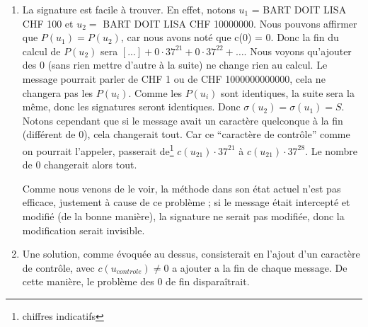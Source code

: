 \documentclass[10p,a4paper]{scrartcl}
\begin{document}
\begin{enumerate}
	\item	La signature est facile à trouver. En effet, notons $u_1$ = BART DOIT LISA CHF 100 et $u_2 =$ BART DOIT LISA CHF 10000000. Nous pouvons affirmer que $P(u_1) = P(u_2)$, car nous avons noté que c(0) = 0. Donc la fin du calcul de $P(u_2)$ sera $[...] + 0\cdot 37^{21} + 0 \cdot 37^{22} + \ldots$. Nous voyons qu'ajouter des 0 (sans rien mettre d'autre à la suite) ne change rien au calcul. Le message pourrait parler de CHF 1 ou de CHF 1000000000000, cela ne changera pas les $P(u_i)$. Comme les $P(u_i)$ sont identiques, la suite sera la même, donc les signatures seront identiques. Donc $\sigma(u_2) = \sigma(u_1) = S$. Notons cependant que si le message avait un caractère quelconque à la fin (différent de 0), cela changerait tout. Car ce \enquote{caractère de contrôle} comme on pourrait l'appeler, passerait de\footnote{chiffres indicatifs} $c(u_{21})\cdot37^{21}$ à $c(u_21) \cdot 37^{28}$. Le nombre de 0 changerait alors tout.
	
			Comme nous venons de le voir, la méthode dans son état actuel n'est pas efficace, justement à cause de ce problème ; si le message était intercepté et modifié (de la bonne manière), la signature ne serait pas modifiée, donc la modification serait invisible.
	\item	 Une solution, comme évoquée au dessus, consisterait en l'ajout d'un caractère de contrôle, avec $c(u_{controle}) \neq 0$ a ajouter a la fin de chaque message. De cette manière, le problème des 0 de fin disparaîtrait.

\end{enumerate}
\end{document}
